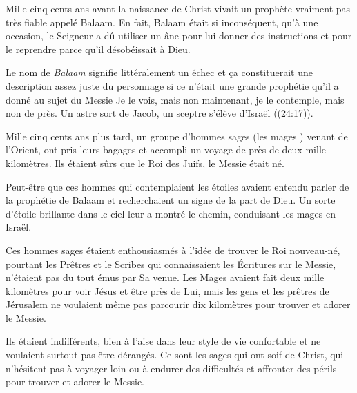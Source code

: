 

Mille cinq cents ans avant la naissance de Christ vivait un prophète vraiment pas très fiable appelé Balaam. En fait, Balaam était si inconséquent, qu'à une occasion, le Seigneur a dû utiliser un âne pour lui donner des instructions et pour le reprendre parce qu'il désobéissait à Dieu.

Le nom de \emph{Balaam} signifie littéralement \Og un échec \Fg{} et ça constituerait une description assez juste du personnage si ce n'était une grande prophétie qu'il a donné au sujet du Messie\frcolon{} \Og Je le vois, mais non maintenant, je le contemple, mais non de près. Un astre sort de Jacob, un sceptre s’élève d’Israël \Fg{} ((24:17)).

Mille cinq cents ans plus tard, un groupe d'hommes sages (\Og les mages \Fg{}) venant de l'Orient, ont pris leurs bagages et accompli un voyage de près de deux mille kilomètres. Ils étaient sûrs que le Roi des Juifs, le Messie était né.

Peut-être que ces hommes qui contemplaient les étoiles avaient entendu parler de la prophétie de Balaam et recherchaient un signe de la part de Dieu. Un sorte d'étoile brillante dans le ciel leur a montré le chemin, conduisant les mages en Israël.

Ces hommes sages étaient enthousiasmés à l'idée de trouver le Roi nouveau-né, pourtant les Prêtres et le Scribes qui connaissaient les Écritures sur le Messie, n'étaient pas du tout émus par Sa venue. Les Mages avaient fait deux mille kilomètres pour voir Jésus et être près de Lui, mais les gens et les prêtres de Jérusalem ne voulaient même pas parcourir dix kilomètres pour trouver et adorer le Messie.

Ils étaient indifférents, bien à l'aise dans leur style de vie confortable et ne voulaient surtout pas être dérangés. Ce sont les sages qui ont soif de Christ, qui n'hésitent pas à voyager loin ou à endurer des difficultés et affronter des périls pour trouver et adorer le Messie.

